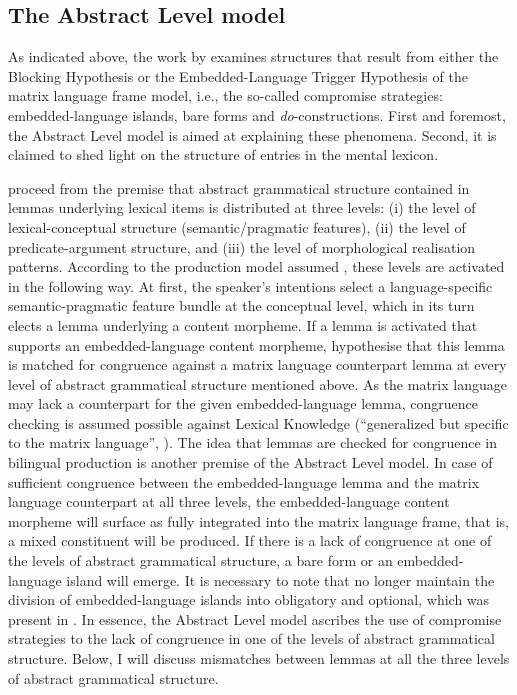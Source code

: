 \subsection{The Abstract Level model}
As indicated above, the work by \citet{myers-scotton-matching-1995} examines structures that result from either the Blocking Hypothesis or the Embedded-Language Trigger Hypothesis of the matrix language frame model, i.e., the so-called compromise strategies: embedded-language islands, bare forms and \textit{do}-constructions. First and foremost, the Abstract Level model is aimed at explaining these phenomena. Second, it is claimed to shed light on the structure of entries in the mental lexicon.

\citet{myers-scotton-matching-1995} proceed from the premise that abstract grammatical structure contained in lemmas underlying lexical items is distributed at three levels: (i) the level of lexical-conceptual structure (semantic/pragmatic features), (ii) the level of predicate-argument structure, and (iii) the level of morphological realisation patterns. According to the production model assumed \citep[23--25, 76--78]{myers-scotton-contact-2002}, these levels are activated in the following way. At first, the speaker's intentions select a language-specific semantic-pragmatic feature bundle at the conceptual level, which in its turn elects a lemma underlying a content morpheme. If a lemma is activated that supports an embedded-language content morpheme, \citet{myers-scotton-matching-1995} hypothesise that this lemma is matched for congruence against a matrix language counterpart lemma at every level of abstract grammatical structure mentioned above. As the matrix language may lack a counterpart for the given embedded-language lemma, congruence checking is assumed possible against Lexical Knowledge (``generalized but specific to the matrix language'', \citealt[97]{myers-scotton-contact-2002}). The idea that lemmas are checked for congruence in bilingual production is another premise of the Abstract Level model. In case of sufficient congruence between the embedded-language lemma and the matrix language counterpart at all three levels, the embedded-language content morpheme will surface as fully integrated into the matrix language frame, that is, a mixed constituent will be produced. If there is a lack of congruence at one of the levels of abstract grammatical structure, a bare form or an embedded-language island will emerge. It is necessary to note that \citet[][]{myers-scotton-matching-1995} no longer maintain the division of embedded-language islands into obligatory and optional, which was present in \citet{myers-scotton-duelling-1993}. In essence, the Abstract Level model ascribes the use of compromise strategies to the lack of congruence in one of the levels of abstract grammatical structure. Below, I will discuss mismatches between lemmas at all the three levels of abstract grammatical structure.

